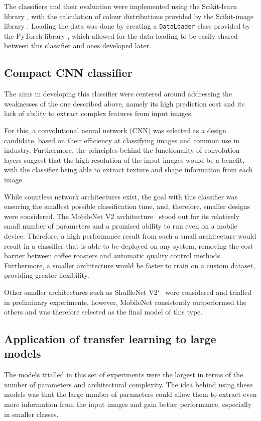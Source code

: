 The classifiers and their evaluation were implemented using the Scikit-learn library \cite{sklearnLibrary}, with the calculation of colour
distributions provided by the Scikit-image library \cite{skImageLibrary}.
Loading the data was done by creating a \verb|DataLoader| class provided by the PyTorch library \cite{pytorchLibrary}, which allowed
for the data loading to be easily shared between this classifier and ones developed later.
\subsection{Compact CNN classifier}
\label{subsec:deep-learning}
The aims in developing this classifier were centered around addressing the weaknesses of the one described above,
namely its high prediction cost and its lack of ability to extract complex features from input images.

For this, a convolutional neural network (CNN) was selected as a design candidate, based on their
efficiency at classifying images and common use in industry.
Furthermore, the principles behind the functionality of convolution layers suggest that the high resolution of the input
images would be a benefit, with the classifier being able to extract texture and shape information from each image.

While countless network architectures exist, the goal with this classifier was ensuring the smallest possible classification time,
and, therefore, smaller designs were considered.
The MobileNet V2 architecture~\cite{mobileNet} stood out for its relatively small number of parameters and a promised ability to run even on
a mobile device.
Therefore, a high performance result from such a small architecture would result in a classifier that is able to be deployed
on any system, removing the cost barrier between coffee roasters and automatic quality control methods.
Furthermore, a smaller architecture would be faster to train on a custom dataset, providing greater flexibility.

Other smaller architectures such as ShuffleNet V2`~\cite{shuffleNet} were considered and trialled in preliminary experiments,
however, MobileNet consistently outperformed the others and was therefore selected as the final model of this type.
\subsection{Application of transfer learning to large models}
\label{subsec:transfer-learning}
The models trialled in this set of experiments were the largest in terms of the number of parameters and
architectural complexity.
The idea behind using these models was that the large number of parameters could allow them to extract even more information
from the input images and gain better performance, especially in smaller classes.

